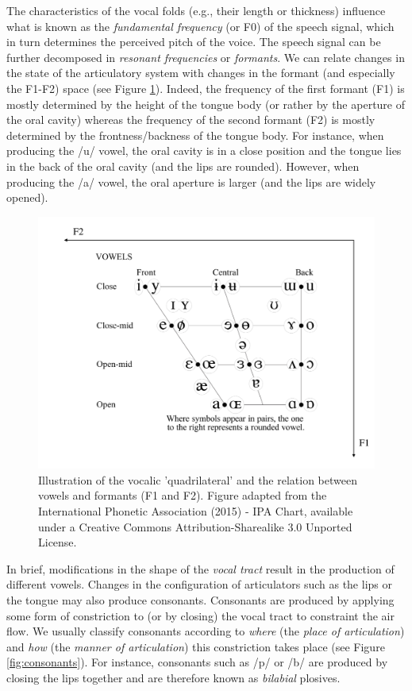 \documentclass[a4paper,12pt,twoside,onecolumn,openright,final,oldfontcommands]{memoir}
\begin{document}
The characteristics of the vocal folds (e.g., their length or thickness) influence what is known as the \emph{fundamental frequency} (or F0) of the speech signal, which in turn determines the perceived pitch of the voice. The speech signal can be further decomposed in \emph{resonant frequencies} or \emph{formants}. We can relate changes in the state of the articulatory system with changes in the formant (and especially the F1-F2) space (see Figure \ref{fig:ipa}). Indeed, the frequency of the first formant (F1) is mostly determined by the height of the tongue body (or rather by the aperture of the oral cavity) whereas the frequency of the second formant (F2) is mostly determined by the frontness/backness of the tongue body. For instance, when producing the /u/ vowel, the oral cavity is in a close position and the tongue lies in the back of the oral cavity (and the lips are rounded). However, when producing the /a/ vowel, the oral aperture is larger (and the lips are widely opened).

\begin{figure}[ht]

{\centering \includegraphics[width=0.75\linewidth]{assets/vowels} 

}

\caption{Illustration of the vocalic 'quadrilateral' and the relation between vowels and formants (F1 and F2). Figure adapted from the International Phonetic Association (2015) - IPA Chart, available under a Creative Commons Attribution-Sharealike 3.0 Unported License.}\label{fig:ipa}
\end{figure}

In brief, modifications in the shape of the \emph{vocal tract} result in the production of different vowels. Changes in the configuration of articulators such as the lips or the tongue may also produce consonants. Consonants are produced by applying some form of constriction to (or by closing) the vocal tract to constraint the air flow. We usually classify consonants according to \emph{where} (the \emph{place of articulation}) and \emph{how} (the \emph{manner of articulation}) this constriction takes place (see Figure \ref{fig:consonants}). For instance, consonants such as /p/ or /b/ are produced by closing the lips together and are therefore known as \emph{bilabial} plosives.
\end{document}
